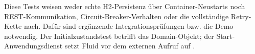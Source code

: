 Diese Tests weisen weder echte H2-Persistenz über Container-Neustarts noch REST-Kommunikation,
Circuit-Breaker-Verhalten oder die vollständige Retry-Kette nach. Dafür sind ergänzende
Integrationsprüfungen bzw. die Demo notwendig. Der Initialzustandstest betrifft das Domain-Objekt;
der Start-Anwendungsdienst setzt Fluid vor dem externen Aufruf auf .

\newpage
